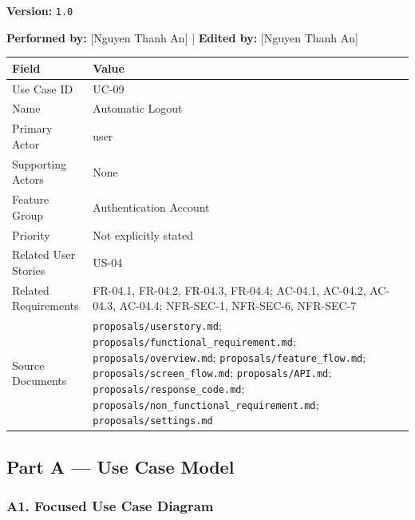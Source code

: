 \documentclass[12pt]{article}
\renewcommand{\baselinestretch}{1.5}
\begin{document}
\textbf{Version:} \texttt{1.0}
\par\medskip

\textbf{Performed by:} [Nguyen Thanh An] | \textbf{Edited by:} [Nguyen Thanh An]
\par\medskip

\begingroup
\small
\renewcommand{\baselinestretch}{1.0}\selectfont
\renewcommand{\arraystretch}{1.15}
\setlength{\tabcolsep}{6pt}
\begin{longtable}{|>{\raggedright\arraybackslash}p{}|>{\raggedright\arraybackslash}p{}|}
\hline
\textbf{Field} & \textbf{Value} \\ \hline
\endhead
Use Case ID & UC-09 \\ \hline
Name & Automatic Logout \\ \hline
Primary Actor & user \\ \hline
Supporting Actors & None \\ \hline
Feature Group & Authentication Account \\ \hline
Priority & Not explicitly stated \\ \hline
Related User Stories & US-04 \\ \hline
Related Requirements & FR-04.1, FR-04.2, FR-04.3, FR-04.4; AC-04.1, AC-04.2, AC-04.3, AC-04.4; NFR-SEC-1, NFR-SEC-6, NFR-SEC-7 \\ \hline
Source Documents & \texttt{proposals/userstory.md}; \texttt{proposals/functional\_requirement.md}; \texttt{proposals/overview.md}; \texttt{proposals/feature\_flow.md}; \texttt{proposals/screen\_flow.md}; \texttt{proposals/API.md}; \texttt{proposals/response\_code.md}; \texttt{proposals/non\_functional\_requirement.md}; \texttt{proposals/settings.md} \\ \hline
\end{longtable}
\endgroup
\par\medskip

\hypertarget{sec:part-a-use-case-model}{}
\subsection*{Part A --- Use Case Model}
\par\medskip

\hypertarget{sec:a1-focused-use-case-diagram}{}
\subsubsection*{A1. Focused Use Case Diagram}
\par\medskip
\end{document}
